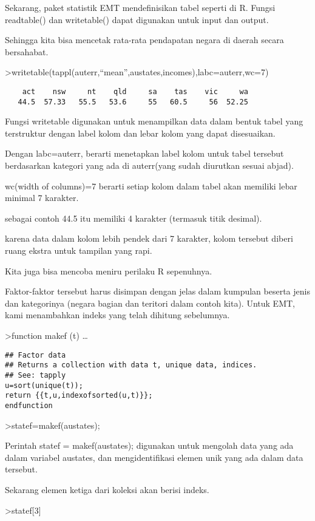 \documentclass[
]{book}
\begin{document}
Sekarang, paket statistik EMT mendefinisikan tabel seperti di R. Fungsi readtable() dan writetable() dapat digunakan untuk input dan output.

Sehingga kita bisa mencetak rata-rata pendapatan negara di daerah secara bersahabat.

\textgreater writetable(tappl(auterr,``mean'',austates,incomes),labc=auterr,wc=7)

\begin{verbatim}
    act    nsw     nt    qld     sa    tas    vic     wa
   44.5  57.33   55.5   53.6     55   60.5     56  52.25
\end{verbatim}

Fungsi writetable digunakan untuk menampilkan data dalam bentuk tabel yang terstruktur dengan label kolom dan lebar kolom yang dapat disesuaikan.

Dengan labc=auterr, berarti menetapkan label kolom untuk tabel tersebut berdasarkan kategori yang ada di auterr(yang sudah diurutkan sesuai abjad).

wc(width of columns)=7 berarti setiap kolom dalam tabel akan memiliki lebar minimal 7 karakter.

sebagai contoh 44.5 itu memiliki 4 karakter (termasuk titik desimal).

karena data dalam kolom lebih pendek dari 7 karakter, kolom tersebut diberi ruang ekstra untuk tampilan yang rapi.

Kita juga bisa mencoba meniru perilaku R sepenuhnya.

Faktor-faktor tersebut harus disimpan dengan jelas dalam kumpulan beserta jenis dan kategorinya (negara bagian dan teritori dalam contoh kita). Untuk EMT, kami menambahkan indeks yang telah dihitung sebelumnya.

\textgreater function makef (t) \ldots{}

\begin{verbatim}
## Factor data
## Returns a collection with data t, unique data, indices.
## See: tapply
u=sort(unique(t));
return {{t,u,indexofsorted(u,t)}};
endfunction
\end{verbatim}

\textgreater statef=makef(austates);

Perintah statef = makef(austates); digunakan untuk mengolah data yang ada dalam variabel austates, dan mengidentifikasi elemen unik yang ada dalam data tersebut.

Sekarang elemen ketiga dari koleksi akan berisi indeks.

\textgreater statef{[}3{]}
\end{document}
